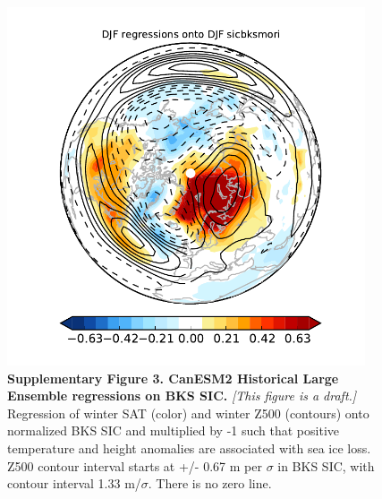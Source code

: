 \documentclass{nature}
\begin{document}
\begin{figure}%
\centering
\noindent\includegraphics[width=25pc]{SuppFigure3.pdf}
\caption{\textbf{Supplementary Figure 3. CanESM2 Historical Large Ensemble regressions on BKS SIC.} \textit{[This figure is a draft.]} Regression of winter SAT (color) and winter Z500 (contours) onto normalized BKS SIC and multiplied by -1 such that positive temperature and height anomalies are associated with sea ice loss. Z500 contour interval starts at +/- 0.67 m per $\sigma$ in BKS SIC, with contour interval 1.33 m/$\sigma$. There is no zero line.
}
\label{fig:supp3} 
\end{figure}
\end{document}
